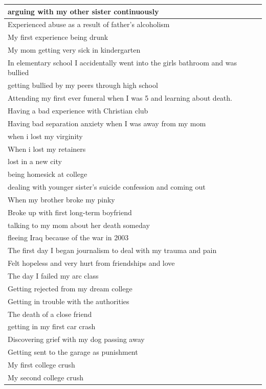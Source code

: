 \documentclass[
  .7em,
  letterpaper,
  DIV=11,
  numbers=noendperiod]{scrartcl}
\begin{document}
\begin{table}
\begin{tabular}{l}
arguing with my other sister continuously\\
\hline
Experienced abuse as a result of father's alcoholism\\
\hline
My first experience being drunk\\
\hline
My mom getting very sick in kindergarten\\
\hline
In elementary school I accidentally went into the girls bathroom and was bullied\\
\hline
getting bullied by my peers through high school\\
\hline
Attending my first ever funeral when I was 5 and learning about death.\\
\hline
Having a bad experience with Christian club\\
\hline
Having bad separation anxiety when I was away from my mom\\
\hline
when i lost my virginity\\
\hline
When i lost my retainers\\
\hline
lost in a new city\\
\hline
being homesick at college\\
\hline
dealing with younger sister's suicide confession and coming out\\
\hline
When my brother broke my pinky\\
\hline
Broke up with first long-term boyfriend\\
\hline
talking to my mom about her death someday\\
\hline
fleeing Iraq because of the war in 2003\\
\hline
The first day I began journalism to deal with my trauma and pain\\
\hline
Felt hopeless and very hurt from friendships and love\\
\hline
The day I failed my arc class\\
\hline
Getting rejected from my dream college\\
\hline
Getting in trouble with the authorities\\
\hline
The death of a close friend\\
\hline
getting in my first car crash\\
\hline
Discovering grief with my dog passing away\\
\hline
Getting sent to the garage as punishment\\
\hline
My first college crush\\
\hline
My second college crush\\

\end{tabular}
\end{table}
\end{document}
